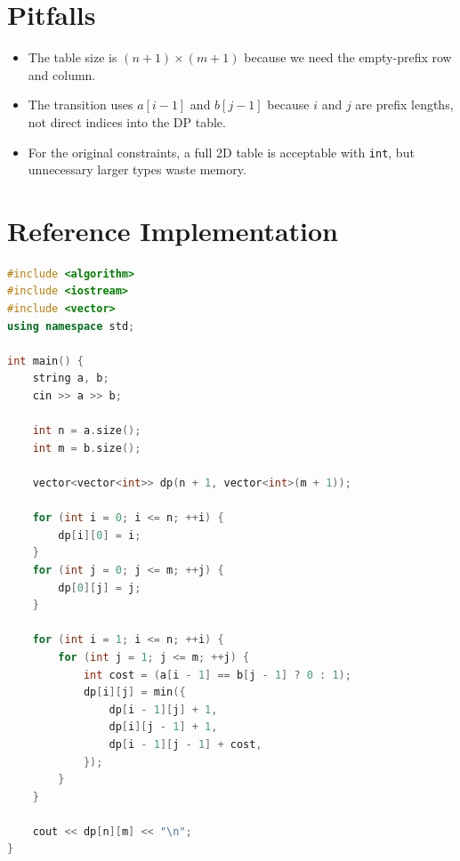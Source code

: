 \section{Pitfalls}

\begin{itemize}
\item The table size is $(n+1) \times (m+1)$ because we need the empty-prefix
row and column.
\item The transition uses $a[i-1]$ and $b[j-1]$ because $i$ and $j$ are prefix
lengths, not direct indices into the DP table.
\item For the original constraints, a full 2D table is acceptable with
\texttt{int}, but unnecessary larger types waste memory.
\end{itemize}

\section{Reference Implementation}

\begin{lstlisting}[language=C++]
#include <algorithm>
#include <iostream>
#include <vector>
using namespace std;

int main() {
    string a, b;
    cin >> a >> b;

    int n = a.size();
    int m = b.size();

    vector<vector<int>> dp(n + 1, vector<int>(m + 1));

    for (int i = 0; i <= n; ++i) {
        dp[i][0] = i;
    }
    for (int j = 0; j <= m; ++j) {
        dp[0][j] = j;
    }

    for (int i = 1; i <= n; ++i) {
        for (int j = 1; j <= m; ++j) {
            int cost = (a[i - 1] == b[j - 1] ? 0 : 1);
            dp[i][j] = min({
                dp[i - 1][j] + 1,
                dp[i][j - 1] + 1,
                dp[i - 1][j - 1] + cost,
            });
        }
    }

    cout << dp[n][m] << "\n";
}
\end{lstlisting}
